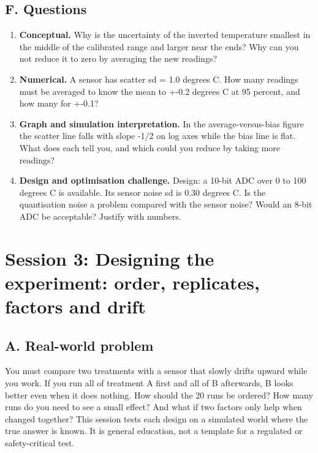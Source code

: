 \documentclass[11pt,a4paper]{article}
\begin{document}
\subsection*{F. Questions}
\begin{enumerate}[nosep]
\item \textbf{Conceptual.} Why is the uncertainty of the inverted temperature smallest in the middle of the calibrated range and larger near the ends? Why can you not reduce it to zero by averaging the new readings?
\item \textbf{Numerical.} A sensor has scatter sd = 1.0 degrees C. How many readings must be averaged to know the mean to +-0.2 degrees C at 95 percent, and how many for +-0.1?
\item \textbf{Graph and simulation interpretation.} In the average-versus-bias figure the scatter line falls with slope -1/2 on log axes while the bias line is flat. What does each tell you, and which could you reduce by taking more readings?
\item \textbf{Design and optimisation challenge.} Design: a 10-bit ADC over 0 to 100 degrees C is available. Its sensor noise sd is 0.30 degrees C. Is the quantisation noise a problem compared with the sensor noise? Would an 8-bit ADC be acceptable? Justify with numbers.
\end{enumerate}

\section{Session 3: Designing the experiment: order, replicates, factors and drift}

\subsection*{A. Real-world problem}
You must compare two treatments with a sensor that slowly drifts upward while you work. If you run all of treatment A first and all of B afterwards, B looks better even when it does nothing. How should the 20 runs be ordered? How many runs do you need to see a small effect? And what if two factors only help when changed together? This session tests each design on a simulated world where the true answer is known. It is general education, not a template for a regulated or safety-critical test.
\end{document}
